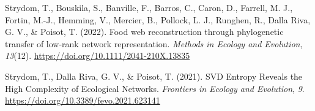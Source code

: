 \documentclass[
]{article}
\newlength{\cslhangindent}
\newenvironment{CSLReferences}[2] %
 {\begin{list}{}{%
  \setlength{\itemindent}{0pt}
  \setlength{\leftmargin}{0pt}
  \setlength{\parsep}{0pt}
  \ifodd #1
   \setlength{\leftmargin}{\cslhangindent}
   \setlength{\itemindent}{-1\cslhangindent}
  \fi
  \setlength{\itemsep}{#2\baselineskip}}}
 {\end{list}}
\begin{document}
\begin{CSLReferences}{1}{0}
Strydom, T., Bouskila, S., Banville, F., Barros, C., Caron, D., Farrell,
M. J., Fortin, M.-J., Hemming, V., Mercier, B., Pollock, L. J., Runghen,
R., Dalla Riva, G. V., \& Poisot, T. (2022). Food web reconstruction
through phylogenetic transfer of low-rank network representation.
\emph{Methods in Ecology and Evolution}, \emph{13}(12).
\url{https://doi.org/10.1111/2041-210X.13835}

Strydom, T., Dalla Riva, G. V., \& Poisot, T. (2021). {SVD Entropy
Reveals} the {High Complexity} of {Ecological Networks}. \emph{Frontiers
in Ecology and Evolution}, \emph{9}.
\url{https://doi.org/10.3389/fevo.2021.623141}

\end{CSLReferences}
\end{document}
